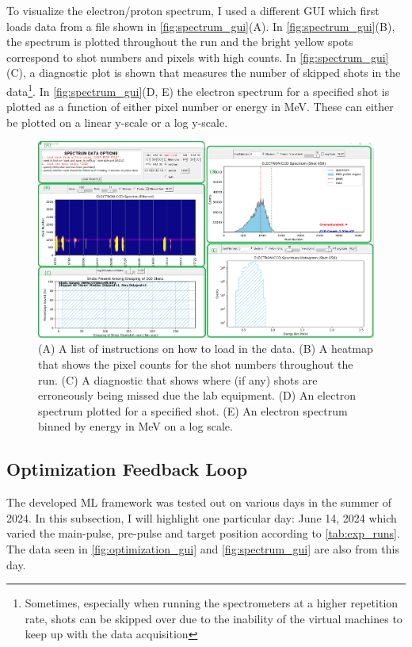 To visualize the electron/proton spectrum, I used a different \gls{GUI} which first loads data from a file shown in \autoref{fig:spectrum_gui}(A). In \autoref{fig:spectrum_gui}(B), the spectrum is plotted throughout the run and the bright yellow spots correspond to shot numbers and pixels with high counts. In \autoref{fig:spectrum_gui}(C), a diagnostic plot is shown that measures the number of skipped shots in the data\footnote{Sometimes, especially when running the spectrometers at a higher repetition rate, shots can be skipped over due to the inability of the virtual machines to keep up with the data acquisition}. In \autoref{fig:spectrum_gui}(D, E) the electron spectrum for a specified shot is plotted as a function of either pixel number or energy in MeV. These can either be plotted on a linear y-scale or a log y-scale.

\begin{figure}
	\centering 
	\includegraphics[width=\linewidth]{planning/images/daq/spectrum_gui.png}
	\caption{(A) A list of instructions on how to load in the data. (B) A heatmap that shows the pixel counts for the shot numbers throughout the run. (C) A diagnostic that shows where (if any) shots are erroneously being missed due the lab equipment. (D) An electron spectrum plotted for a specified shot. (E) An electron spectrum binned by energy in MeV on a log scale.}
	\label{fig:spectrum_gui}
\end{figure}

\subsection{Optimization Feedback Loop}
The developed \gls{ML} framework was tested out on various days in the summer of 2024. In this subsection, I will highlight one particular day: June 14, 2024 which varied the main-pulse, pre-pulse and target position according to \autoref{tab:exp_runs}. The data seen in \autoref{fig:optimization_gui} and \autoref{fig:spectrum_gui} are also from this day. 



